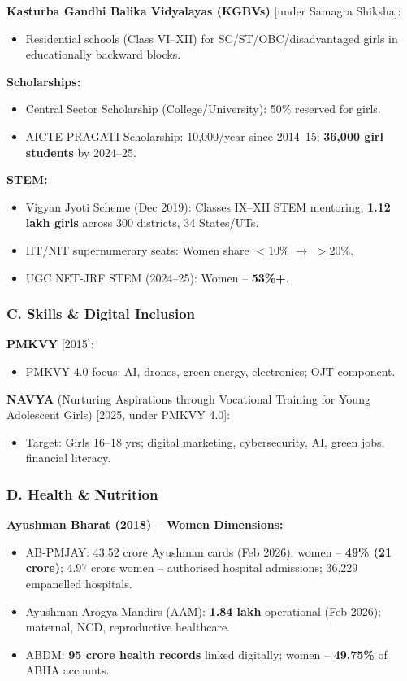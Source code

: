 \textbf{Kasturba Gandhi Balika Vidyalayas (KGBVs)} [under Samagra Shiksha]:
\begin{itemize}
  \item Residential schools (Class VI--XII) for SC/ST/OBC/disadvantaged girls in educationally backward blocks.
\end{itemize}

\textbf{Scholarships:}
\begin{itemize}
  \item Central Sector Scholarship (College/University): 50\% reserved for girls.
  \item AICTE PRAGATI Scholarship: 10,000/year since 2014--15; \textbf{36,000 girl students} by 2024--25.
\end{itemize}

\textbf{STEM:}
\begin{itemize}
  \item Vigyan Jyoti Scheme (Dec 2019): Classes IX--XII STEM mentoring; \textbf{1.12 lakh girls} across 300 districts, 34 States/UTs.
  \item IIT/NIT supernumerary seats: Women share $<$10\% $\rightarrow$ $>$20\%.
  \item UGC NET-JRF STEM (2024--25): Women -- \textbf{53\%+}.
\end{itemize}

\subsubsection*{C. Skills \& Digital Inclusion}

\textbf{PMKVY} [2015]:
\begin{itemize}
  \item PMKVY 4.0 focus: AI, drones, green energy, electronics; OJT component.
\end{itemize}

\textbf{NAVYA} (Nurturing Aspirations through Vocational Training for Young Adolescent Girls) [2025, under PMKVY 4.0]:
\begin{itemize}
  \item Target: Girls 16--18 yrs; digital marketing, cybersecurity, AI, green jobs, financial literacy.
\end{itemize}

\subsubsection*{D. Health \& Nutrition}

\textbf{Ayushman Bharat (2018) -- Women Dimensions:}
\begin{itemize}
  \item AB-PMJAY: 43.52 crore Ayushman cards (Feb 2026); women -- \textbf{49\% (21 crore)}; 4.97 crore women -- authorised hospital admissions; 36,229 empanelled hospitals.
  \item Ayushman Arogya Mandirs (AAM): \textbf{1.84 lakh} operational (Feb 2026); maternal, NCD, reproductive healthcare.
  \item ABDM: \textbf{95 crore health records} linked digitally; women -- \textbf{49.75\%} of ABHA accounts.
\end{itemize}

